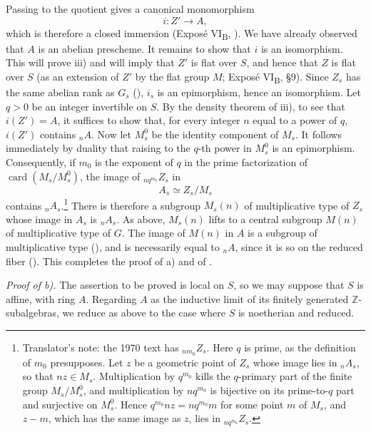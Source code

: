 Passing to the quotient gives a canonical monomorphism
\[
  i:Z'\longrightarrow A,
\]
which is therefore a closed immersion (Exposé
VI\textsubscript{B}, ). We have already observed that \(A\)
is an abelian prescheme. It remains to show that \(i\) is an
isomorphism. This will prove  iii) and will imply that \(Z'\)
is flat over \(S\), and hence that \(Z\) is flat over \(S\)
(as an extension of \(Z'\) by the flat group \(M\); Exposé
VI\textsubscript{B}, \S9). Since \(Z_s\) has the same abelian rank
as \(G_s\) (), \(i_s\) is an epimorphism, hence an
isomorphism. Let \(q>0\) be an integer invertible on \(S\). By the
density theorem of  iii), to see that \(i(Z')=A\), it suffices
to show that, for every integer \(n\) equal to a power of \(q\),
\(i(Z')\) contains \({}_nA\). Now let \(M_s^0\) be the identity
component of \(M_s\). It follows immediately by duality that
raising to the \(q\)-th power in \(M_s^0\) is an epimorphism.
Consequently, if \(m_0\) is the exponent of \(q\) in the prime
factorization of \(\operatorname{card}(M_s/M_s^0)\), the image of
\({}_{nq^{m_0}}Z_s\) in
\[
  A_s\simeq Z_s/M_s
\]
contains \({}_nA_s\).\footnote{Translator's note: the 1970 text has \({}_{nm_0}Z_s\). Here \(q\) is
prime, as the definition of \(m_0\) presupposes. Let \(z\) be a geometric point of \(Z_s\) whose
image lies in \({}_nA_s\), so that \(nz\in M_s\). Multiplication by \(q^{m_0}\) kills the
\(q\)-primary part of the finite group \(M_s/M_s^0\), and multiplication by \(nq^{m_0}\) is bijective
on its prime-to-\(q\) part and surjective on \(M_s^0\). Hence \(q^{m_0}nz=nq^{m_0}m\) for some
point \(m\) of \(M_s\), and \(z-m\), which has the same image as \(z\), lies in
\({}_{nq^{m_0}}Z_s\).} There is therefore a subgroup \(M_s(n)\) of
multiplicative type of \(Z_s\) whose image in \(A_s\) is
\({}_nA_s\). As above, \(M_s(n)\) lifts to a central subgroup
\(M(n)\) of multiplicative type of \(G\). The image of \(M(n)\)
in \(A\) is a subgroup of multiplicative type (),
and is necessarily equal to \({}_nA\), since it is so on the
reduced fiber (). This completes the proof of
 a) and of .

\medskip
\noindent\textit{Proof of  b).}
The assertion to be proved is local on \(S\), so we may suppose
that \(S\) is affine, with ring \(A\). Regarding \(A\) as the
inductive limit of its finitely generated
\(\mathbb Z\)-subalgebras, we reduce as above to the case where
\(S\) is noetherian and reduced.


